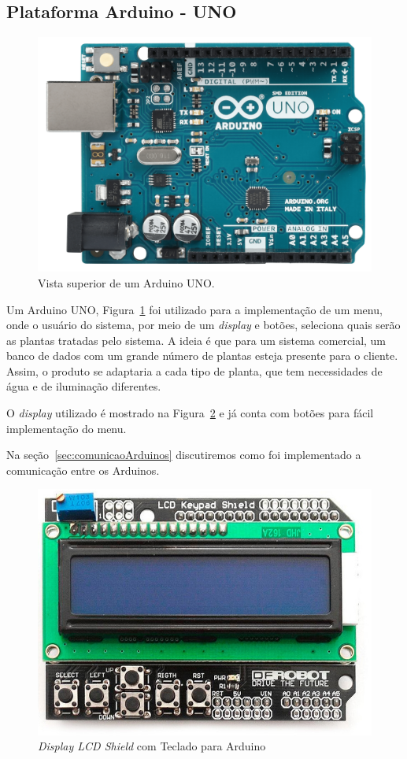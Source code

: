 \documentclass[a4paper,12pt]{report}
\begin{document}
		\subsection{Plataforma Arduino - UNO}
			
			\begin{figure}[!h]
				\centering
				\includegraphics[width=0.5\linewidth]{figs/ARDUINO_UNO_A06}
				\caption{Vista superior de um Arduino UNO.}
				\label{fig:UNO}
			\end{figure}
		
			Um Arduino UNO, Figura~\ref{fig:UNO} foi utilizado para a implementação de um menu, onde o usuário do sistema, por meio de um \textit{display} e botões, seleciona quais serão as plantas tratadas pelo sistema. A ideia é que para um sistema comercial, um banco de dados com um grande número de plantas esteja presente para o cliente. Assim, o produto se adaptaria a cada tipo de planta, que tem necessidades de água e de iluminação diferentes. 
			
			O \textit{display} utilizado é mostrado na Figura~\ref{fig:keyboard} e já conta com botões para fácil implementação do menu.
			
		    Na seção~\ref{sec:comunicaoArduinos} discutiremos como foi implementado a comunicação entre os Arduinos. 	
			\begin{figure}[!h]
				\centering
				\includegraphics[width=0.7\linewidth]{figs/lcd-keyboard}
				\caption{\textit{Display LCD Shield} com Teclado para Arduino}
				\label{fig:keyboard}
			\end{figure}
			
\end{document}
